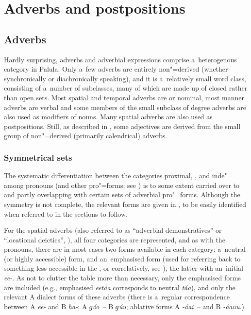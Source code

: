 \chapter{Adverbs and postpositions}
\label{chap:7}

\section{Adverbs}
\label{sec:7-1}


Hardly surprising, adverbs and adverbial expressions comprise a~heterogenous category in Palula. Only a~few adverbs are entirely non"=derived (whether synchronically or diachronically speaking), and it is a~relatively small word class, consisting of a~number of subclasses, many of which are made up of closed rather than open sets. Most spatial and temporal adverbs are  or nominal, most manner adverbs are verbal and some members of the small subclass of degree adverbs are also used as modifiers of nouns. Many spatial adverbs are also used as postpositions. Still, as described in , some adjectives are derived from the small group of non"=derived (primarily calendrical) adverbs.


\subsection{Symmetrical  sets}
\label{subsec:7-1-1}

The systematic differentiation between the categories proximal, ,  and inde"= among pronouns (and other pro"=forms; see ) is to some extent carried over to and partly overlapping with certain sets of adverbial pro"=forms. Although the symmetry is not complete, the relevant forms are given in , to be easily identified when referred to in the sections to follow.



For the spatial adverbs (also referred to as ``adverbial demonstratives'' or ``locational deictics'', \citealt[431]{diessel2006}), all four categories are represented, and as with the pronouns, there are in most cases two forms available in each category: a~neutral (or highly accessible) form, and an~emphasised form (used for referring back to something less accessible in the , or correlatively, see ), the latter with an~initial \textit{ee-}. As not to clutter the table more than necessary, only the emphasised forms are included (e.g., emphasised \textit{eetáa} corresponds to neutral \textit{táa}), and only the relevant A dialect forms of these adverbs (there is a~regular correspondence between A \textit{ee-} and B \textit{ha-}; A \textit{ɡóo}~-- B \textit{ɡúu}; ablative forms A \textit{-áai}~-- and B \textit{-áauu}.)



